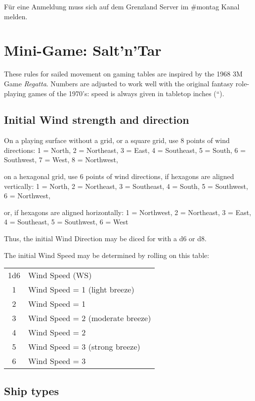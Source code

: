 \documentclass[11pt]{wbzine}
\begin{document}
\begin{multicols}{2}
	Für eine Anmeldung muss sich auf dem Grenzland Server im
	\#montag Kanal melden.

\section{Mini-Game: Salt'n'Tar}

These rules for sailed movement on gaming tables are inspired by the
1968 3M Game \emph{Regatta}. Numbers are adjusted to work well with the
original fantasy role-playing games of the 1970's: speed is always given
in tabletop inches (``).

\subsection{Initial Wind strength and
direction}

On a playing surface without a grid, or a square grid, use 8 points of
wind directions: 1 = North, 2 = Northeast, 3 = East, 4 = Southeast, 5 =
South, 6 = Southwest, 7 = West, 8 = Northwest,

on a hexagonal grid, use 6 points of wind directions, if hexagons are
aligned vertically: 1 = North, 2 = Northeast, 3 = Southeast, 4 = South,
5 = Southwest, 6 = Northwest,

or, if hexagons are aligned horizontally: 1 = Northwest, 2 = Northeast,
3 = East, 4 = Southeast, 5 = Southwest, 6 = West

Thus, the initial Wind Direction may be diced for with a d6 or d8.

The initial Wind Speed may be determined by rolling on this table:

\begin{tabularx}{\columnwidth}{cZ}
1d6 & Wind Speed (WS) \\
1 & Wind Speed = 1 (light breeze) \\
2 & Wind Speed = 1 \\
3 & Wind Speed = 2 (moderate breeze) \\
4 & Wind Speed = 2 \\
5 & Wind Speed = 3 (strong breeze) \\
6 & Wind Speed = 3 \\
\end{tabularx}

\subsection{Ship types}


\end{multicols}
\end{document}
